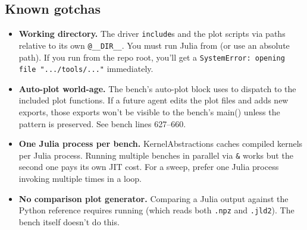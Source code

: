\documentclass[11pt,a4paper]{article}
\begin{document}
\subsection{Known gotchas}

\begin{itemize}[itemsep=2pt,leftmargin=*]
\item \textbf{Working directory.} The driver \texttt{include}s
   and the plot scripts via
  paths relative to its own \texttt{@\_\_DIR\_\_}. You must run
  Julia from  (or use an absolute path). If
  you run from the repo root, you'll get a
  \texttt{SystemError: opening file ".../tools/..."} immediately.
\item \textbf{Auto-plot world-age.} The bench's auto-plot block uses
   to dispatch to the included plot
  functions. If a future agent edits the plot files and adds new
  exports, those exports won't be visible to the bench's main()
  unless the  pattern is preserved. See bench
  lines 627--660.
\item \textbf{One Julia process per bench.} KernelAbstractions
  caches compiled kernels per Julia process. Running multiple
  benches in parallel via \texttt{\&} works but the second one
  pays its own JIT cost. For a sweep, prefer one Julia process
  invoking  multiple times in a loop.
\item \textbf{No comparison plot generator.} Comparing a Julia
  output against the Python reference requires running
   (which reads both \texttt{.npz}
  and \texttt{.jld2}). The bench itself doesn't do this.
\end{itemize}
\end{document}
